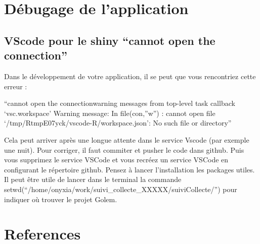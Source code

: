 \documentclass[
  letterpaper,
  DIV=11,
  numbers=noendperiod]{scrreprt}
\newlength{\cslhangindent}
\newlength{\cslentryspacingunit} %
\newenvironment{CSLReferences}[2] %
 {%
  \setlength{\parindent}{0pt}
  \ifodd #1
  \let\oldpar\par
  \def\par{\hangindent=\cslhangindent\oldpar}
  \fi
  \setlength{\parskip}{#2\cslentryspacingunit}
 }%
 {}
\begin{document}

\hypertarget{duxe9bugage-de-lapplication}{%
\chapter{Débugage de l'application}\label{duxe9bugage-de-lapplication}}

\hypertarget{vscode-pour-le-shiny-cannot-open-the-connection}{%
\section{VScode pour le shiny ``cannot open the
connection''}\label{vscode-pour-le-shiny-cannot-open-the-connection}}

Dans le développement de votre application, il se peut que vous
rencontriez cette erreur :

``cannot open the connectionwarning messages from top-level task
callback `vsc.workspace' Warning message: In file(con,''w'') : cannot
open file `/tmp/RtmpE07yck/vscode-R/workspace.json': No such file or
directory''

Cela peut arriver après une longue attente dans le service Vscode (par
exemple une nuit). Pour corriger, il faut commiter et pusher le code
dans github. Puis vous supprimez le service VSCode et vous recréez un
service VSCode en configurant le répertoire github. Pensez à lancer
l'installation les packages utiles. Il peut être utile de lancer dans le
terminal la commande
setwd(``/home/onyxia/work/suivi\_collecte\_XXXXX/suiviCollecte/'') pour
indiquer où trouver le projet Golem.


\hypertarget{references}{%
\chapter*{References}\label{references}}

\hypertarget{refs}{}
\begin{CSLReferences}{0}{0}
\end{CSLReferences}



\printindex
\end{document}

